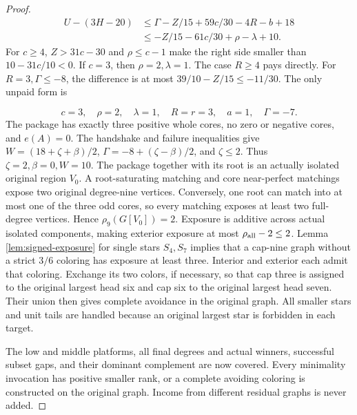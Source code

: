 \documentclass[11pt,a4paper]{article}
\theoremstyle{definition}
\begin{document}
\begin{proof}
\[
\begin{split}
U-(3H-20)&\le\Gamma-Z/15+59c/30-4R-b+18\\
&\le-Z/15-61c/30+\rho-\lambda+10.
\end{split}
\]
For $c\ge4$, $Z>31c-30$ and $\rho\le c-1$ make the right side
smaller than $10-31c/10<0$.
If $c=3$, then $\rho=2,\lambda=1$.
The case $R\ge4$ pays directly.
For $R=3,\Gamma\le-8$, the difference is at most
$39/10-Z/15\le-11/30$.
The only unpaid form is

\[
c=3,\quad\rho=2,\quad\lambda=1,\quad R=r=3,\quad a=1,\quad\Gamma=-7.
\]
The package has exactly three positive whole cores, no zero or negative cores,
and $e(A)=0$.
The handshake and failure inequalities give
$W=(18+\zeta+\beta)/2$, $\Gamma=-8+(\zeta-\beta)/2$, and $\zeta\le2$.
Thus $\zeta=2,\beta=0,W=10$.
The package together with its root is an actually isolated original region $V_0$.
A root-saturating matching and core near-perfect matchings expose two original
degree-nine vertices. Conversely, one root can match into at most one of the
three odd cores, so every matching exposes at least two full-degree vertices.
Hence $\rho_9(G[V_0])=2$.
Exposure is additive across actual isolated components, making exterior exposure
at most $\rho_{\rm all}-2\le2$.
Lemma \ref{lem:signed-exposure} for single stars $S_4,S_7$ implies that a cap-nine
graph without a strict $3/6$ coloring has exposure at least three.
Interior and exterior each admit that coloring. Exchange its two colors, if necessary, so that cap three is assigned to the original largest head six and cap six to the original largest head seven. Their union then gives complete avoidance in the original graph.
All smaller stars and unit tails are handled because an original largest star
is forbidden in each target.

The low and middle platforms, all final degrees and actual winners,
successful subset gaps, and their dominant complement are now covered.
Every minimality invocation has positive smaller rank, or a complete avoiding
coloring is constructed on the original graph.
Income from different residual graphs is never added.
\end{proof}
\end{document}
